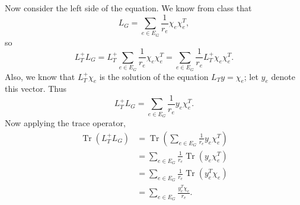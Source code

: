 \documentclass{article}
\newcommand{\0}{\mathbf{0}}
\DeclareMathOperator{\Tr}{Tr}
\begin{document}
\begin{enumerate}
\begin{enumerate}
    Now consider the left side of the equation.
    We know from class that
    \begin{equation*}
      L_G = \sum_{e \in E_G} \frac{1}{r_e} \chi_e \chi_e^T,
    \end{equation*}
    so
    \begin{equation*}
      L_T^+ L_G = L_T^+ \sum_{e \in E_G} \frac{1}{r_e} \chi_e \chi_e^T = \sum_{e \in E_G} \frac{1}{r_e} L_T^+ \chi_e \chi_e^T.
    \end{equation*}
    Also, we know that $L_T^+ \chi_e$ is the solution of the equation $L_T y = \chi_e$; let $y_e$ denote this vector.
    Thus
    \begin{equation*}
      L_T^+ L_G = \sum_{e \in E_G} \frac{1}{r_e} y_e \chi_e^T.
    \end{equation*}
    Now applying the trace operator,
    \begin{align*}
      \Tr(L_T^+ L_G) & = \Tr\left(\sum_{e \in E_G} \frac{1}{r_e} y_e \chi_e^T\right) \\
      & = \sum_{e \in E_G} \frac{1}{r_e} \Tr(y_e \chi_e^T) \\
      & = \sum_{e \in E_G} \frac{1}{r_e} \Tr(y_e^T \chi_e) \\
      & = \sum_{e \in E_G} \frac{y_e^T \chi_e}{r_e}.
    \end{align*}


\end{enumerate}
\end{enumerate}
\end{document}
